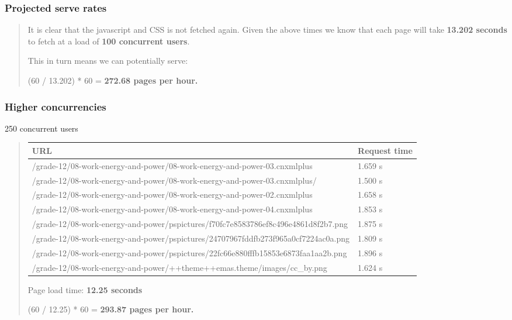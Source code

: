 \documentclass[letterpaper,10pt,english]{sphinxmanual}
\begin{document}
\subsubsection{Projected serve rates}
\label{index:id1}\begin{quote}

It is clear that the javascript and CSS is not fetched again.  Given the
above times we know that each page will take \textbf{13.202 seconds} to fetch at
a load of \textbf{100 concurrent users}.

This in turn means we can potentially serve:

(60 / 13.202) * 60 = \textbf{272.68 pages per hour.}
\end{quote}


\subsubsection{Higher concurrencies}
\label{index:id2}
250 concurrent users
\begin{quote}

\begin{tabulary}{\linewidth}{|L|L|}
\hline
\textbf{\relax 
URL
} & \textbf{\relax 
Request time
}\\\hline

/grade-12/08-work-energy-and-power/08-work-energy-and-power-03.cnxmlplus
 & 
1.659 s
\\\hline

/grade-12/08-work-energy-and-power/08-work-energy-and-power-03.cnxmlplus/
 & 
1.500 s
\\\hline

/grade-12/08-work-energy-and-power/08-work-energy-and-power-02.cnxmlplus
 & 
1.658 s
\\\hline

/grade-12/08-work-energy-and-power/08-work-energy-and-power-04.cnxmlplus
 & 
1.853 s
\\\hline

/grade-12/08-work-energy-and-power/pspictures/f70fc7e8583786ef8c496e4861d8f2b7.png
 & 
1.875 s
\\\hline

/grade-12/08-work-energy-and-power/pspictures/24707967fddfb273f965a0cf7224ac0a.png
 & 
1.809 s
\\\hline

/grade-12/08-work-energy-and-power/pspictures/22fc66e880fffb15853e6873faa1aa2b.png
 & 
1.896 s
\\\hline

/grade-12/08-work-energy-and-power/++theme++emas.theme/images/cc\_by.png
 & 
1.624 s
\\\hline
\end{tabulary}


Page load time: \textbf{12.25 seconds}

(60 / 12.25) * 60 = \textbf{293.87 pages per hour.}
\end{quote}
\end{document}
